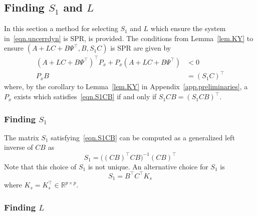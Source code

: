 \subsection{Finding $S_{1}$ and $L$}\label{sec.findingS1andL}

In this section a method for selecting $S_{1}$ and $L$ which ensure the system in\ \eqref{eqn.uncerrdyn} is SPR, is provided.
The conditions from Lemma~\ref{lem.KY} to ensure $(A+LC+B\Psi^{\top},B,S_{1}C)$ is SPR are given by
\begin{align}
  \label{eqn.lyapal}
  (A+LC+B\Psi^{\top})^{\top}P_{x}+P_{x}(A+LC+B\Psi^{\top}) &< 0 \\
  \label{eqn.S1CB}
  P_{x}B &= (S_{1}C)^{\top}
\end{align}
where, by the corollary to Lemma~\ref{lem.KY} in Appendix~\ref{app.preliminaries}, a $P_{x}$ exists which satisfies\ \eqref{eqn.S1CB} if and only if $S_{1}CB=(S_{1}CB)^{\top}$.

\subsubsection{Finding $S_{1}$}

The matrix $S_{1}$ satisfying\ \eqref{eqn.S1CB} can be computed as a generalized left inverse of $CB$ as
\begin{equation}
  \label{eqn.S1}
  S_{1}=\bigr((CB)^{\top}CB\bigr)^{-1}(CB)^{\top}
\end{equation}
Note that this choice of $S_{1}$ is not unique.
An alternative choice for $S_{1}$ is
\begin{equation}
  \label{eqn.S1alternative}
  S_{1} = B^{\top}C^{\top}K_{s}
\end{equation}
where $K_{s}=K_{s}^{\top}\in\mathbb{R}^{p\times p}$.

\subsubsection{Finding $L$}\label{subsection.obtainX}

